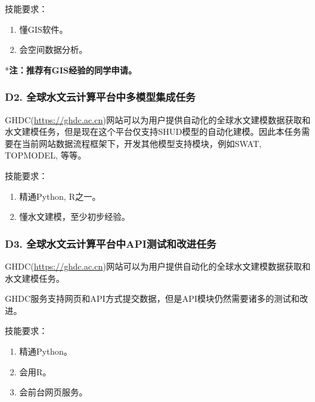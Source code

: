 \documentclass[
]{book}
\providecommand{\tightlist}{%
  \setlength{\itemsep}{0pt}\setlength{\parskip}{0pt}}
\begin{document}
技能要求：

\begin{enumerate}
\def\labelenumi{\arabic{enumi}.}
\tightlist
\item
  懂GIS软件。
\item
  会空间数据分析。
\end{enumerate}

*\textbf{注：推荐有GIS经验的同学申请。}

\hypertarget{d2.-ux5168ux7403ux6c34ux6587ux4e91ux8ba1ux7b97ux5e73ux53f0ux4e2dux591aux6a21ux578bux96c6ux6210ux4efbux52a1}{%
\subsubsection{\texorpdfstring{\textbf{D2. 全球水文云计算平台中多模型集成任务}}{D2. 全球水文云计算平台中多模型集成任务}}\label{d2.-ux5168ux7403ux6c34ux6587ux4e91ux8ba1ux7b97ux5e73ux53f0ux4e2dux591aux6a21ux578bux96c6ux6210ux4efbux52a1}}

GHDC(\url{https://ghdc.ac.cn})网站可以为用户提供自动化的全球水文建模数据获取和水文建模任务，但是现在这个平台仅支持SHUD模型的自动化建模。因此本任务需要在当前网站数据流程框架下，开发其他模型支持模块，例如SWAT, TOPMODEL, 等等。

技能要求：

\begin{enumerate}
\def\labelenumi{\arabic{enumi}.}
\tightlist
\item
  精通Python, R之一。
\item
  懂水文建模，至少初步经验。
\end{enumerate}

\hypertarget{d3.-ux5168ux7403ux6c34ux6587ux4e91ux8ba1ux7b97ux5e73ux53f0ux4e2dapiux6d4bux8bd5ux548cux6539ux8fdbux4efbux52a1}{%
\subsubsection{\texorpdfstring{\textbf{D3. 全球水文云计算平台中API测试和改进任务}}{D3. 全球水文云计算平台中API测试和改进任务}}\label{d3.-ux5168ux7403ux6c34ux6587ux4e91ux8ba1ux7b97ux5e73ux53f0ux4e2dapiux6d4bux8bd5ux548cux6539ux8fdbux4efbux52a1}}

GHDC(\url{https://ghdc.ac.cn})网站可以为用户提供自动化的全球水文建模数据获取和水文建模任务。

GHDC服务支持网页和API方式提交数据，但是API模块仍然需要诸多的测试和改进。

技能要求：

\begin{enumerate}
\def\labelenumi{\arabic{enumi}.}
\tightlist
\item
  精通Python。
\item
  会用R。
\item
  会前台网页服务。
\end{enumerate}
\end{document}
